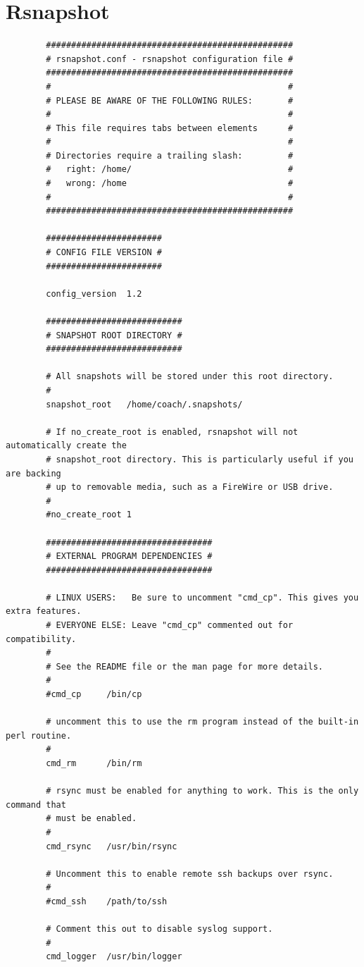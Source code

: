 \documentclass[a4paper]{report}
\begin{document}
\section{Rsnapshot}
	\begin{lstlisting}
		#################################################
		# rsnapshot.conf - rsnapshot configuration file #
		#################################################
		#                                               #
		# PLEASE BE AWARE OF THE FOLLOWING RULES:       #
		#                                               #
		# This file requires tabs between elements      #
		#                                               #
		# Directories require a trailing slash:         #
		#   right: /home/                               #
		#   wrong: /home                                #
		#                                               #
		#################################################

		#######################
		# CONFIG FILE VERSION #
		#######################

		config_version	1.2

		###########################
		# SNAPSHOT ROOT DIRECTORY #
		###########################

		# All snapshots will be stored under this root directory.
		#
		snapshot_root	/home/coach/.snapshots/

		# If no_create_root is enabled, rsnapshot will not automatically create the
		# snapshot_root directory. This is particularly useful if you are backing
		# up to removable media, such as a FireWire or USB drive.
		#
		#no_create_root	1

		#################################
		# EXTERNAL PROGRAM DEPENDENCIES #
		#################################

		# LINUX USERS:   Be sure to uncomment "cmd_cp". This gives you extra features.
		# EVERYONE ELSE: Leave "cmd_cp" commented out for compatibility.
		#
		# See the README file or the man page for more details.
		#
		#cmd_cp		/bin/cp

		# uncomment this to use the rm program instead of the built-in perl routine.
		#
		cmd_rm		/bin/rm

		# rsync must be enabled for anything to work. This is the only command that
		# must be enabled.
		#
		cmd_rsync	/usr/bin/rsync

		# Uncomment this to enable remote ssh backups over rsync.
		#
		#cmd_ssh	/path/to/ssh

		# Comment this out to disable syslog support.
		#
		cmd_logger	/usr/bin/logger


\end{lstlisting}
\end{document}
